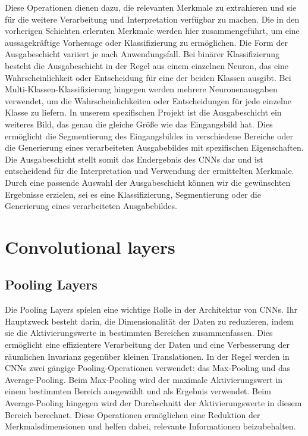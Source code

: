    Diese Operationen dienen dazu, die relevanten Merkmale zu extrahieren und sie für die weitere Verarbeitung und Interpretation verfügbar zu machen. Die in den vorherigen Schichten erlernten Merkmale werden hier zusammengeführt, um eine aussagekräftige Vorhersage oder Klassifizierung zu ermöglichen.
    Die Form der Ausgabeschicht variiert je nach Anwendungsfall. Bei binärer Klassifizierung besteht die Ausgabeschicht in der Regel aus einem einzelnen Neuron, das eine Wahrscheinlichkeit oder Entscheidung für eine der beiden Klassen ausgibt. 
    Bei Multi-Klassen-Klassifizierung hingegen werden mehrere Neuronenausgaben verwendet, um die Wahrscheinlichkeiten oder Entscheidungen für jede einzelne Klasse zu liefern.
    In unserem spezifischen Projekt ist die Ausgabeschicht ein weiteres Bild, das genau die gleiche Größe wie das Eingangsbild hat. 
    Dies ermöglicht die Segmentierung des Eingangsbildes in verschiedene Bereiche oder die Generierung eines verarbeiteten Ausgabebildes mit spezifischen Eigenschaften.
    Die Ausgabeschicht stellt somit das Endergebnis des CNNs dar und ist entscheidend für die Interpretation und Verwendung der ermittelten Merkmale. 
    Durch eine passende Auswahl der Ausgabeschicht können wir die gewünschten Ergebnisse erzielen, sei es eine Klassifizierung, Segmentierung oder die Generierung eines verarbeiteten Ausgabebildes.

\section{Convolutional layers}

\subsection{Pooling Layers}\label{sec:pooling_layers}

    Die Pooling Layers spielen eine wichtige Rolle in der Architektur von \acfp{CNN}. 
    Ihr Hauptzweck besteht darin, die Dimensionalität der Daten zu reduzieren, indem sie die Aktivierungswerte in bestimmten Bereichen zusammenfassen. 
    Dies ermöglicht eine effizientere Verarbeitung der Daten und eine Verbesserung der räumlichen Invarianz gegenüber kleinen Translationen.
    In der Regel werden in CNNs zwei gängige Pooling-Operationen verwendet: das Max-Pooling und das Average-Pooling. 
    Beim Max-Pooling wird der maximale Aktivierungswert in einem bestimmten Bereich ausgewählt und als Ergebnis verwendet. 
    Beim Average-Pooling hingegen wird der Durchschnitt der Aktivierungswerte in diesem Bereich berechnet. 
    Diese Operationen ermöglichen eine Reduktion der Merkmalsdimensionen und helfen dabei, relevante Informationen beizubehalten.


